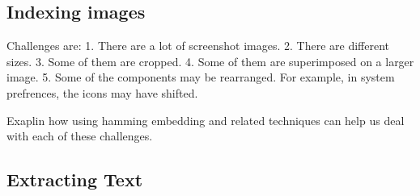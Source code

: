 \documentclass{www2010-submission}
\begin{document}
%




\subsection{Indexing images}
Challenges are:
1. There are a lot of screenshot images.
2. There are different sizes.
3. Some of them are cropped.
4. Some of them are superimposed on a larger image.
5. Some of the components may be rearranged. For example,
in system prefrences, the icons may have shifted.

Exaplin how using hamming embedding and related techniques can
help us deal with each of these challenges.

\subsection{Extracting Text}
\end{document}
